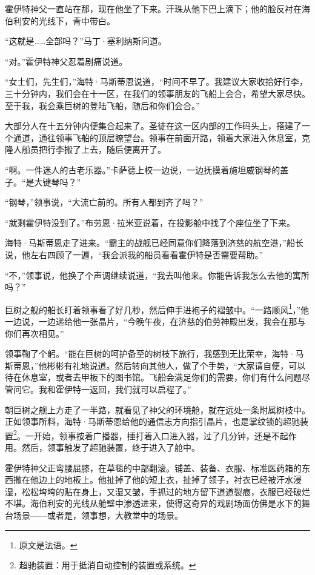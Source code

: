 \documentclass[AutoFakeBold=true]{book}
\begin{document}
霍伊特神父一直站在那，现在他坐了下来。汗珠从他下巴上滴下；他的脸反衬在海伯利安的光线下，青中带白。

``这就是……全部吗？''马丁·塞利纳斯问道。

``对。''霍伊特神父忍着剧痛说道。

``女士们，先生们，''海特·马斯蒂恩说道，``时间不早了。我建议大家收拾好行李，三十分钟内，我们会在十一区，在我们的领事朋友的飞船上会合，希望大家尽快。至于我，我会乘巨树的登陆飞船，随后和你们会合。''

大部分人在十五分钟内便集合起来了。圣徒在这一区内部的工作码头上，搭建了一个通道，通往领事飞船的顶层瞭望台。领事在前面开路，领着大家进入休息室，克隆人船员把行李搬了上去，随后便离开了。

``啊。一件迷人的古老乐器。''卡萨德上校一边说，一边抚摸着施坦威钢琴的盖子。``是大键琴吗？''

``钢琴，''领事说，``大流亡前的。所有人都到齐了吗？''

``就剩霍伊特没到了。''布劳恩·拉米亚说着，在投影舱中找了个座位坐了下来。

海特·马斯蒂恩走了进来。``霸主的战舰已经同意你们降落到济慈的航空港，''船长说，他左右四顾了一遍，``我会派我的船员看看霍伊特是否需要帮助。''

``不，''领事说，他换了个声调继续说道，``我去叫他来。你能告诉我怎么去他的寓所吗？''

巨树之舰的船长盯着领事看了好几秒，然后伸手进袍子的褶皱中。``{\kaishu 一路顺风}\footnote{原文是法语。}，''他一边说，一边递给他一张晶片，``今晚午夜，在济慈的伯劳神殿出发，我会在那与你们再次相见。''

领事鞠了个躬。``能在巨树的呵护备至的树枝下旅行，我感到无比荣幸，海特·马斯蒂恩，''他彬彬有礼地说道。然后转向其他人，做了个手势，``大家请自便，可以待在休息室，或者去甲板下的图书馆。飞船会满足你们的需要，你们有什么问题尽管问它。我和霍伊特一返回，我们就可以启程了。''

朝巨树之舰上方走了一半路，就看见了神父的环境舱，就在远处一条附属树枝中。正如领事所料，海特·马斯蒂恩给他的通信志方向指引晶片，也是掌纹锁的超驰装置\footnote{超驰装置：用于抵消自动控制的装置或系统。}。一开始，领事按着广播器，捶打着入口进入器，过了几分钟，还是不起作用。然后，领事触发了超驰装置，终于进入了舱中。

霍伊特神父正弯腰屈膝，在草毯的中部翻滚。铺盖、装备、衣服、标准医药箱的东西撒在他边上的地板上。他扯掉了他的短上衣，扯掉了领子，衬衣已经被汗水浸湿，松松垮垮的贴在身上，又湿又皱，手抓过的地方留下道道裂痕，衣服已经破烂不堪。海伯利安的光线从舱壁中渗透进来，使得这奇异的戏剧场面仿佛是水下的舞台场景——或者是，领事想，大教堂中的场景。
\end{document}

